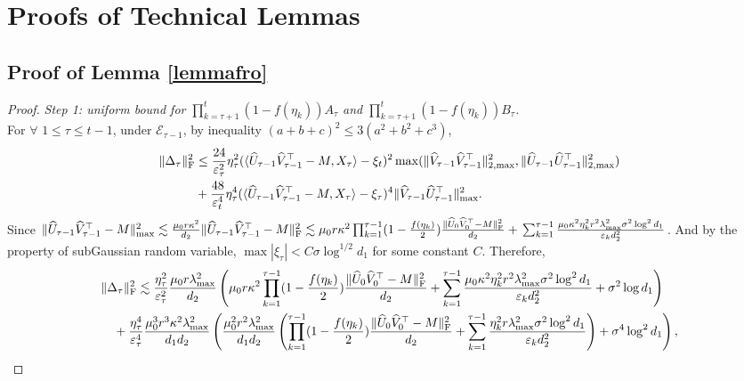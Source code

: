 \documentclass[12pt]{article}
\newcommand\fro[1]{\| #1 \|_{\rm{F}}}
\newcommand{\inp}[2]{\langle #1,#2\rangle}
\def\calE{{\mathcal E}}
\theoremstyle{plain}
\begin{document}
\section{Proofs of Technical Lemmas}

\subsection{Proof of Lemma \ref{lemmafro}}
\begin{proof}
    \emph{Step 1: uniform bound for $\prod_{k=\tau+1}^{t} (1-f(\eta_k))A_{\tau}$ and $\prod_{k=\tau+1}^{t} (1-f(\eta_k))B_{\tau}$.} \\
    For $\forall$ $1\leq\tau\leq t-1$, under $\calE_{\tau-1}$, by inequality $(a+b+c)^2\leq 3(a^2+b^2+c^3)$,
    \begin{align*}
        \fro{\Delta_\tau}^2 &\leq \frac{24}{\varepsilon_\tau^2}\eta_\tau^2 (\inp{\widehat{U}_{\tau-1}\widehat{V}_{\tau-1}^{\top} - M}{X_\tau}-\xi_t)^2\max(\|\widehat{V}_{\tau-1}\widehat{V}_{\tau-1}^{\top}\|_{2,\max}^2,\|\widehat{U}_{\tau-1}\widehat{U}_{\tau-1}^{\top}\|_{2,\max}^2) \\ &+ \frac{48}{\varepsilon_t^4}\eta_\tau^4 (\inp{\widehat{U}_{\tau-1}\widehat{V}_{\tau-1}^{\top} - M}{X_\tau}-\xi_\tau)^4\|\widehat{V}_{\tau-1}\widehat{U}_{\tau-1}^{\top}\|_{\max}^2. 
    \end{align*}
    Since $\|\widehat{U}_{\tau-1}\widehat{V}_{\tau-1}^{\top} - M\|_{\max}^2\lesssim \frac{\mu_0 r \kappa^2}{d_2}\fro{\widehat{U}_{\tau-1}\widehat{V}_{\tau-1}^{\top} - M}^2\lesssim \mu_0 r \kappa^2 \prod_{k=1}^{\tau-1} (1-\frac{f(\eta_k)}{2})\frac{\fro{\widehat{U}_0\widehat{V}_0^{\top}-M}^2}{d_2} + \\ \sum_{k=1}^{\tau-1}\frac{\mu_0\kappa^2 \eta_k^2r^2\lambda_{\max}^2\sigma^2\log^2d_1}{\varepsilon_k d_2^2}$. And by the property of subGaussian random variable, $\max|\xi_\tau|<C\sigma\log^{1/2}d_1$ for some constant $C$. Therefore,
    \begin{align*}
        &\fro{\Delta_\tau}^2 \lesssim \frac{\eta_\tau^2}{\varepsilon_\tau^2}\frac{\mu_0r\lambda_{\max}^2}{d_2}\left(\mu_0r\kappa^2 \prod_{k=1}^{\tau-1} (1-\frac{f(\eta_k)}{2})\frac{\fro{\widehat{U}_0\widehat{V}_0^{\top}-M}^2}{d_2} + \sum_{k=1}^{\tau-1}\frac{\mu_0\kappa^2 \eta_k^2r^2\lambda_{\max}^2\sigma^2\log^2d_1}{\varepsilon_k d_2^2} + \sigma^2\log d_1 \right)\\ &\quad + \frac{\eta_\tau^4}{\varepsilon_\tau^4}\frac{\mu_0^3r^3\kappa^2\lambda_{\max}^2}{d_1d_2}\left(\frac{\mu_0^2r^2\lambda_{\max}^2}{d_1d_2}\left(\prod_{k=1}^{\tau-1} (1-\frac{f(\eta_k)}{2})\frac{\fro{\widehat{U}_0\widehat{V}_0^{\top}-M}^2}{d_2} + \sum_{k=1}^{\tau-1}\frac{\eta_k^2r\lambda_{\max}^2\sigma^2\log^2d_1}{\varepsilon_k d_2^2}\right) + \sigma^4\log^2 d_1\right),

\end{align*}
\end{proof}
\end{document}
